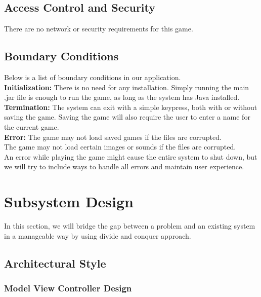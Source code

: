 \documentclass[12pt]{article} %
\begin{document}
\subsection{Access Control and  Security} %

There are no network or security requirements for this game.


\subsection{Boundary Conditions} %
Below is a list of boundary conditions in our application.\\
\textbf{Initialization:} There is no need for any installation. Simply running the main .jar file is enough to run the game, as long as the system has Java installed.\\
\textbf{Termination:} The system can exit with a simple keypress, both with or without saving the game. Saving the game will also require the user to enter a name for the current game.\\
\textbf{Error:} The game may not load saved games if the files are corrupted.\\
The game may not load certain images or sounds if the files are corrupted.\\
		An error while playing the game might cause the entire system to shut down, but we will try to include ways to handle all errors and maintain user experience.\\


\section{Subsystem Design} %

In this section, we will bridge the gap between a problem and an existing system in a manageable way by using divide and conquer approach.

\subsection{Architectural Style}

\subsubsection{Model View Controller Design}

\end{document}
